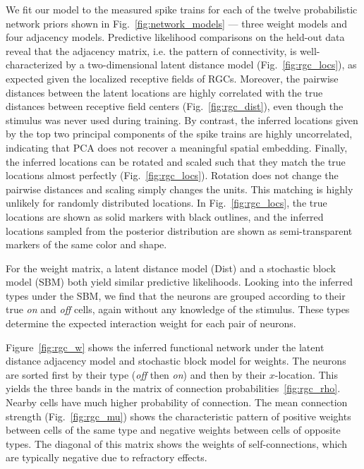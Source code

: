 \sloppy We fit our model to the measured spike trains for each of the
twelve probabilistic network priors shown in
Fig.~\ref{fig:network_models} --- three weight models and four
adjacency models. Predictive likelihood comparisons on the held-out
data reveal that the adjacency matrix, i.e. the pattern of
connectivity, is well-characterized by a two-dimensional latent
distance model (Fig.~\ref{fig:rgc_locs}), as expected given the
localized receptive fields of RGCs. Moreover, the pairwise distances
between the latent locations are highly correlated with the true
distances between receptive field centers (Fig.~\ref{fig:rgc_dist}),
even though the stimulus was never used during training. By contrast,
the inferred locations given by the top two principal components of
the spike trains are highly uncorrelated, indicating that PCA does not
recover a meaningful spatial embedding.  Finally, the inferred
locations can be rotated and scaled such that they match the true
locations almost perfectly (Fig.~\ref{fig:rgc_locs}). Rotation does
not change the pairwise distances and scaling simply changes the
units. This matching is highly unlikely for randomly distributed
locations.  In Fig.~\ref{fig:rgc_locs}, the true locations are shown
as solid markers with black outlines, and the inferred locations
sampled from the posterior distribution are shown as semi-transparent
markers of the same color and shape.

For the weight matrix, a latent distance model (Dist) and a stochastic
block model (SBM) both yield similar predictive likelihoods. Looking
into the inferred types under the SBM, we find that the neurons are
grouped according to their true \textit{on} and \textit{off} cells,
again without any knowledge of the stimulus. These types determine 
the expected interaction weight for each pair of neurons. 

Figure~\ref{fig:rgc_w} shows the inferred functional network under the
latent distance adjacency model and stochastic block model for
weights.  The neurons are sorted first by their type (\textit{off}
then \textit{on}) and then by their $x$-location. This yields the
three bands in the matrix of connection
probabilities~\ref{fig:rgc_rho}. Nearby cells have much higher
probability of connection. The mean connection strength
(Fig.~\ref{fig:rgc_mu}) shows the characteristic pattern of positive
weights between cells of the same type and negative weights between
cells of opposite types. The diagonal of this matrix shows the weights
of self-connections, which are typically negative due to refractory
effects. 


